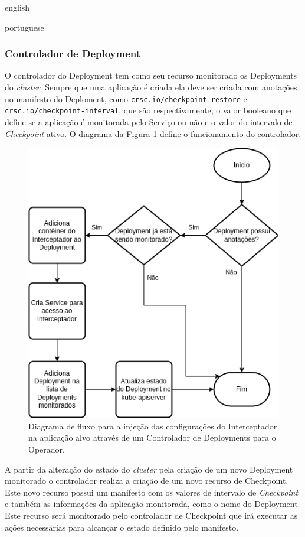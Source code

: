 \begin{otherlanguage*}{english}
\begin{otherlanguage*}{portuguese}
\subsubsection{Controlador de Deployment}

O controlador do Deployment tem como seu recurso monitorado os Deployments do
\textit{cluster}. Sempre que uma aplicação é criada ela deve ser criada com anotações
no manifesto do Deploment, como \texttt{crsc.io/checkpoint-restore} e
\texttt{crsc.io/checkpoint-interval}, que são respectivamente, o valor booleano que
define se a aplicação é monitorada pelo Serviço ou não e o valor do intervalo de
\textit{Checkpoint} ativo. O diagrama da Figura \ref{fig:deployment-controller-diagram}
define o funcionamento do controlador.

\begin{figure}[h]
\centering
\includegraphics[scale=0.8]{images/deployment-controller.png}
\caption{Diagrama de fluxo para a injeção das configurações do Interceptador na aplicação alvo através de um Controlador de Deployments para o Operador.}
\label{fig:deployment-controller-diagram}
\end{figure}

A partir da alteração do estado do \textit{cluster} pela criação de um novo Deployment
monitorado o controlador realiza a criação de um novo recurso de Checkpoint. Este novo
recurso possui um manifesto com os valores de intervalo de \textit{Checkpoint} e também
as informações da aplicação monitorada, como o nome do Deployment. Este recurso será 
monitorado pelo controlador de Checkpoint que irá executar as ações necessárias para
alcançar o estado definido pelo manifesto.


\end{otherlanguage*}
\end{otherlanguage*}
